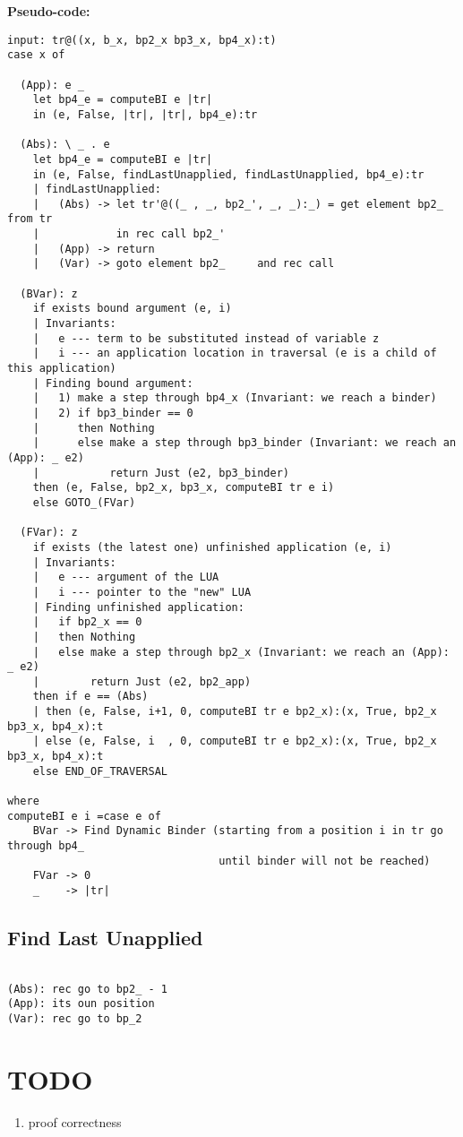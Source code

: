 \documentclass[a4paper, 12pt]{article} %
\begin{document}
\textbf{Pseudo-code:}
\begin{verbatim}
input: tr@((x, b_x, bp2_x bp3_x, bp4_x):t)
case x of
  
  (App): e _
    let bp4_e = computeBI e |tr|
    in (e, False, |tr|, |tr|, bp4_e):tr

  (Abs): \ _ . e
    let bp4_e = computeBI e |tr|
    in (e, False, findLastUnapplied, findLastUnapplied, bp4_e):tr
    | findLastUnapplied:
    |   (Abs) -> let tr'@((_ , _, bp2_', _, _):_) = get element bp2_ from tr
    |            in rec call bp2_'
    |   (App) -> return
    |   (Var) -> goto element bp2_     and rec call

  (BVar): z
    if exists bound argument (e, i)
    | Invariants:
    |   e --- term to be substituted instead of variable z
    |   i --- an application location in traversal (e is a child of this application)
    | Finding bound argument:
    |   1) make a step through bp4_x (Invariant: we reach a binder)
    |   2) if bp3_binder == 0
    |      then Nothing
    |      else make a step through bp3_binder (Invariant: we reach an (App): _ e2)
    |           return Just (e2, bp3_binder)
    then (e, False, bp2_x, bp3_x, computeBI tr e i)
    else GOTO_(FVar)

  (FVar): z
    if exists (the latest one) unfinished application (e, i)
    | Invariants:
    |   e --- argument of the LUA
    |   i --- pointer to the "new" LUA
    | Finding unfinished application:
    |   if bp2_x == 0
    |   then Nothing
    |   else make a step through bp2_x (Invariant: we reach an (App): _ e2)
    |        return Just (e2, bp2_app)
    then if e == (Abs)
    | then (e, False, i+1, 0, computeBI tr e bp2_x):(x, True, bp2_x bp3_x, bp4_x):t
    | else (e, False, i  , 0, computeBI tr e bp2_x):(x, True, bp2_x bp3_x, bp4_x):t
    else END_OF_TRAVERSAL

where
computeBI e i =case e of
    BVar -> Find Dynamic Binder (starting from a position i in tr go through bp4_
                                 until binder will not be reached)
    FVar -> 0
    _    -> |tr|
\end{verbatim}

\subsection*{Find Last Unapplied}
\begin{verbatim}

(Abs): rec go to bp2_ - 1
(App): its oun position
(Var): rec go to bp_2

\end{verbatim}



\section{TODO}
\begin{enumerate}
\item proof correctness
\end{enumerate}
\end{document}
